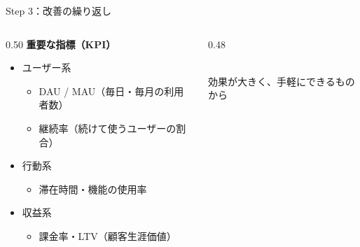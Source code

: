 \documentclass[aspectratio=169]{beamer}
\begin{document}
\begin{frame}{Step 3：改善の繰り返し}
\begin{columns}[T]
\begin{column}{0.50\textwidth}
\small\textbf{重要な指標（KPI）}
\begin{itemize}
  \item ユーザー系
  \begin{itemize}\footnotesize
    \item DAU / MAU（毎日・毎月の利用者数）
    \item 継続率（続けて使うユーザーの割合）
  \end{itemize}
  \item 行動系
  \begin{itemize}\footnotesize
    \item 滞在時間・機能の使用率
  \end{itemize}
  \item 収益系
  \begin{itemize}\footnotesize
    \item 課金率・LTV（顧客生涯価値）
  \end{itemize}
\end{itemize}
\end{column}
\begin{column}{0.48\textwidth}
\\[0.3em]
{\footnotesize 効果が大きく、手軽にできるものから}
\end{column}
\end{columns}
\end{frame}
\end{document}

